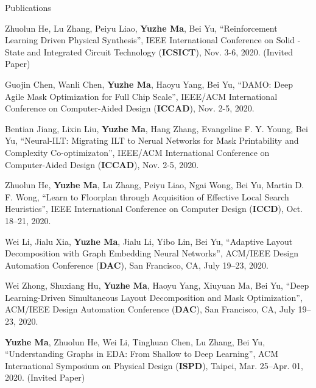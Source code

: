 \begin{rSection}{Publications}
\begin{description}[font=\normalfont]
\item[{[C19]}]{
        Zhuolun He, Lu Zhang, Peiyu Liao, \textbf{Yuzhe Ma}, Bei Yu,
        ``Reinforcement Learning Driven Physical Synthesis'',
        IEEE International Conference on Solid -State and Integrated Circuit Technology (\textbf{ICSICT}), Nov. 3-6, 2020. (Invited Paper)
    }

\item[{[C18]}]{
        Guojin Chen, Wanli Chen, \textbf{Yuzhe Ma}, Haoyu Yang, Bei Yu,
        ``DAMO: Deep Agile Mask Optimization for Full Chip Scale'',
        IEEE/ACM International Conference on Computer-Aided Design (\textbf{ICCAD}), Nov. 2-5, 2020.
    }

\item[{[C17]}]{
        Bentian Jiang, Lixin Liu, \textbf{Yuzhe Ma}, Hang Zhang, Evangeline F. Y. Young, Bei Yu,
        ``Neural-ILT: Migrating ILT to Nerual Networks for Mask Printability and Complexity Co-optimizaton'',
        IEEE/ACM International Conference on Computer-Aided Design (\textbf{ICCAD}), Nov. 2-5, 2020.
    }

\item[{[C16]}]{
        Zhuolun He, \textbf{Yuzhe Ma}, Lu Zhang, Peiyu Liao, Ngai Wong, Bei Yu, Martin D. F. Wong,
        ``Learn to Floorplan through Acquisition of Effective Local Search Heuristics'',
        IEEE International Conference on Computer Design (\textbf{ICCD}), Oct. 18–21, 2020.
    }

\item[{[C15]}]{
        Wei Li, Jialu Xia, \textbf{Yuzhe Ma}, Jialu Li, Yibo Lin, Bei Yu,
        ``Adaptive Layout Decomposition with Graph Embedding Neural Networks'',
        ACM/IEEE Design Automation Conference (\textbf{DAC}), San Francisco, CA, July 19–23, 2020.
    }

\item[{[C14]}]{
        Wei Zhong, Shuxiang Hu, \textbf{Yuzhe Ma}, Haoyu Yang, Xiuyuan Ma, Bei Yu,
        ``Deep Learning-Driven Simultaneous Layout Decomposition and Mask Optimization'',
        ACM/IEEE Design Automation Conference (\textbf{DAC}), San Francisco, CA, July 19–23, 2020.
    }

\item[{[C13]}]{
        \textbf{Yuzhe Ma}, Zhuolun He, Wei Li, Tinghuan Chen, Lu Zhang, Bei Yu,
        ``Understanding Graphs in EDA: From Shallow to Deep Learning'',
        ACM International Symposium on Physical Design (\textbf{ISPD}), Taipei, Mar. 25–Apr. 01, 2020. (Invited Paper)
    }


\end{description}
\end{rSection}
